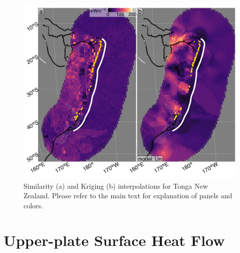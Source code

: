 \begin{figure}[htbp]

{\centering \includegraphics[width=1\linewidth,]{assets/figs/chpt3/TongaNewZealandDiffComp} 

}

\caption[Similarityand Kriging interpolations for Tonga New Zealand]{Similarity (a) and Kriging (b) interpolations for Tonga New Zealand. Please refer to the main text for explanation of panels and colors.}\label{fig:tongaNewZealandDiff}
\end{figure}

\clearpage

\hypertarget{lateralDiffAppendix}{%
\section{Upper-plate Surface Heat Flow}\label{lateralDiffAppendix}}

